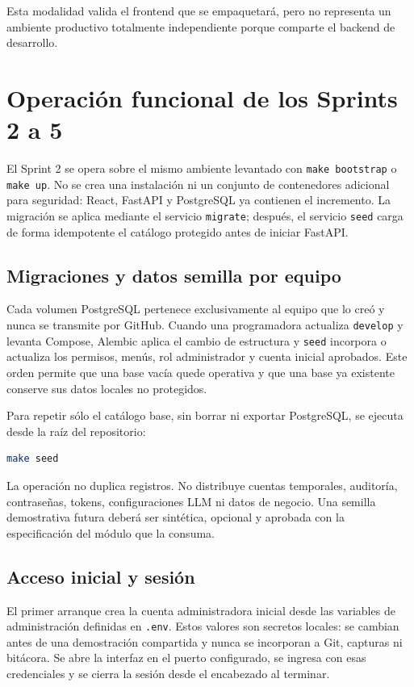 \documentclass[11pt,letterpaper]{article}
\newcommand{\file}[1]{\texttt{#1}}
\begin{document}
Esta modalidad valida el frontend que se empaquetará, pero no representa un ambiente productivo totalmente independiente porque comparte el backend de desarrollo.

\section{Operación funcional de los Sprints 2 a 5}

El Sprint 2 se opera sobre el mismo ambiente levantado con \file{make bootstrap} o \file{make up}. No se crea una instalación ni un conjunto de contenedores adicional para seguridad: React, FastAPI y PostgreSQL ya contienen el incremento. La migración se aplica mediante el servicio \file{migrate}; después, el servicio \file{seed} carga de forma idempotente el catálogo protegido antes de iniciar FastAPI.

\subsection{Migraciones y datos semilla por equipo}

Cada volumen PostgreSQL pertenece exclusivamente al equipo que lo creó y nunca se transmite por GitHub. Cuando una programadora actualiza \file{develop} y levanta Compose, Alembic aplica el cambio de estructura y \file{seed} incorpora o actualiza los permisos, menús, rol administrador y cuenta inicial aprobados. Este orden permite que una base vacía quede operativa y que una base ya existente conserve sus datos locales no protegidos.

Para repetir sólo el catálogo base, sin borrar ni exportar PostgreSQL, se ejecuta desde la raíz del repositorio:

\begin{lstlisting}[style=terminal,language=bash]
make seed
\end{lstlisting}

La operación no duplica registros. No distribuye cuentas temporales, auditoría, contraseñas, tokens, configuraciones LLM ni datos de negocio. Una semilla demostrativa futura deberá ser sintética, opcional y aprobada con la especificación del módulo que la consuma.

\subsection{Acceso inicial y sesión}

El primer arranque crea la cuenta administradora inicial desde las variables de administración definidas en \file{.env}. Estos valores son secretos locales: se cambian antes de una demostración compartida y nunca se incorporan a Git, capturas ni bitácora. Se abre la interfaz en el puerto configurado, se ingresa con esas credenciales y se cierra la sesión desde el encabezado al terminar.
\end{document}

